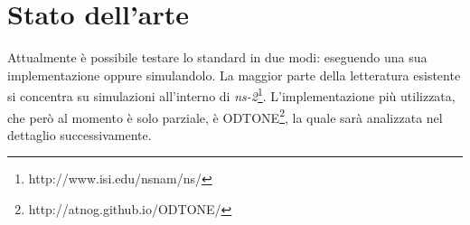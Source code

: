 \section{Stato dell'arte}
Attualmente è possibile testare lo standard in due modi: eseguendo una sua implementazione oppure simulandolo. La maggior parte della letteratura esistente si concentra su simulazioni all'interno di {\em ns-2}\footnote{http://www.isi.edu/nsnam/ns/}. L'implementazione più utilizzata, che però al momento è solo parziale, è ODTONE\footnote{http://atnog.github.io/ODTONE/}, la quale sarà analizzata nel dettaglio successivamente.